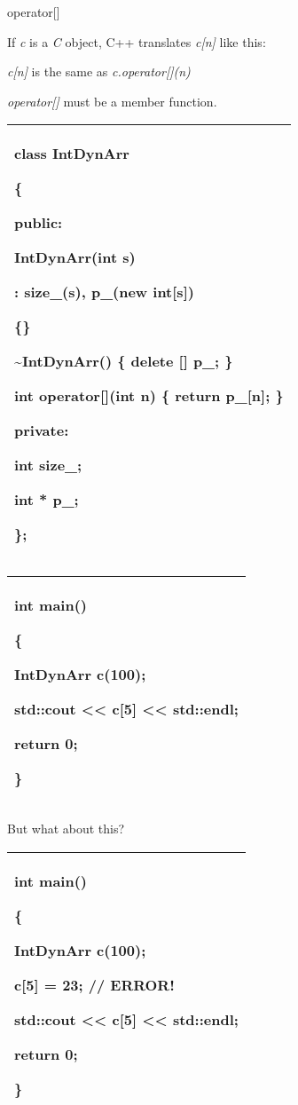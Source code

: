 \documentclass[
]{article}
\begin{document}
operator{[}{]}

If \emph{c} is a \emph{C} object, C++ translates \emph{c{[}n{]}} like
this:

\emph{c{[}n{]} }is the same as\emph{ c.operator{[}{]}(n)}

\emph{operator{[}{]}} must be a member function.

\begin{longtable}[]{@{}l@{}}
\toprule
\endhead
\begin{minipage}[t]{0.97\columnwidth}\raggedright
class IntDynArr

\{

public:

IntDynArr(int s)

: size\_(s), p\_(new int{[}s{]})

\{\}

\textasciitilde IntDynArr() \{ delete {[}{]} p\_; \}

\textbf{int operator{[}{]}(int n)} \{ return p\_{[}n{]}; \}

private:

int size\_;

int * p\_;

\};\strut
\end{minipage}\tabularnewline
\bottomrule
\end{longtable}

\begin{longtable}[]{@{}l@{}}
\toprule
\endhead
\begin{minipage}[t]{0.97\columnwidth}\raggedright
int main()

\{

IntDynArr c(100);

std::cout \textless\textless{} c{[}5{]} \textless\textless{} std::endl;

return 0;

\}\strut
\end{minipage}\tabularnewline
\bottomrule
\end{longtable}

But what about this?

\begin{longtable}[]{@{}l@{}}
\toprule
\endhead
\begin{minipage}[t]{0.97\columnwidth}\raggedright
int main()

\{

IntDynArr c(100);

c{[}5{]} = 23; // ERROR!

std::cout \textless\textless{} c{[}5{]} \textless\textless{} std::endl;

return 0;

\}\strut
\end{minipage}\tabularnewline
\bottomrule
\end{longtable}
\end{document}
